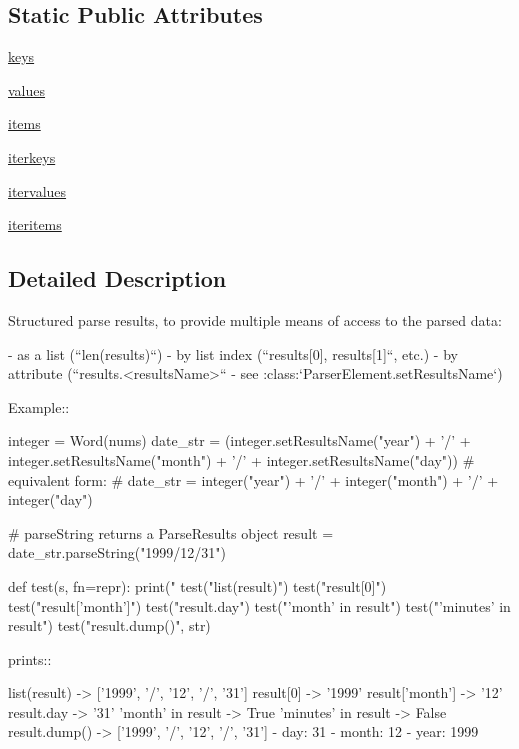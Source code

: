\subsection*{Static Public Attributes}
\begin{DoxyCompactItemize}
\item 
\hyperlink{classpip_1_1__vendor_1_1pyparsing_1_1ParseResults_a972a663948a152aa70c1cecc4340db37}{keys}
\item 
\hyperlink{classpip_1_1__vendor_1_1pyparsing_1_1ParseResults_a3fc8f301068e11082e50c07eea057eb4}{values}
\item 
\hyperlink{classpip_1_1__vendor_1_1pyparsing_1_1ParseResults_ac28f1f7cdb9004e10087bef39b32d25d}{items}
\item 
\hyperlink{classpip_1_1__vendor_1_1pyparsing_1_1ParseResults_ac465ede38bbf81a884bffb7f1bf29ebd}{iterkeys}
\item 
\hyperlink{classpip_1_1__vendor_1_1pyparsing_1_1ParseResults_aa34fd97d8a46eca4c7e73271be4ec1ac}{itervalues}
\item 
\hyperlink{classpip_1_1__vendor_1_1pyparsing_1_1ParseResults_a209e1917aabd69360e696a207871c69f}{iteritems}
\end{DoxyCompactItemize}


\subsection{Detailed Description}
\begin{DoxyVerb}Structured parse results, to provide multiple means of access to
the parsed data:

   - as a list (``len(results)``)
   - by list index (``results[0], results[1]``, etc.)
   - by attribute (``results.<resultsName>`` - see :class:`ParserElement.setResultsName`)

Example::

    integer = Word(nums)
    date_str = (integer.setResultsName("year") + '/'
                    + integer.setResultsName("month") + '/'
                    + integer.setResultsName("day"))
    # equivalent form:
    # date_str = integer("year") + '/' + integer("month") + '/' + integer("day")

    # parseString returns a ParseResults object
    result = date_str.parseString("1999/12/31")

    def test(s, fn=repr):
        print("%
    test("list(result)")
    test("result[0]")
    test("result['month']")
    test("result.day")
    test("'month' in result")
    test("'minutes' in result")
    test("result.dump()", str)

prints::

    list(result) -> ['1999', '/', '12', '/', '31']
    result[0] -> '1999'
    result['month'] -> '12'
    result.day -> '31'
    'month' in result -> True
    'minutes' in result -> False
    result.dump() -> ['1999', '/', '12', '/', '31']
    - day: 31
    - month: 12
    - year: 1999
\end{DoxyVerb}
 


